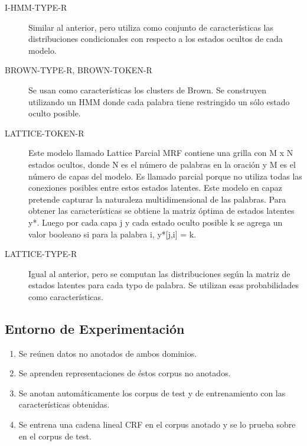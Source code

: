 \documentclass[11pt,spanish]{article}
\begin{document}
\begin{description}
    \item[I-HMM-TYPE-R] Similar al anterior, pero utiliza como conjunto de características las distribuciones condicionales con respecto a los estados ocultos de cada modelo.
    \item[BROWN-TYPE-R, BROWN-TOKEN-R] Se usan como características los clusters de Brown. Se construyen utilizando un HMM donde cada palabra tiene restringido un sólo estado oculto posible.
    \item[LATTICE-TOKEN-R] Este modelo llamado Lattice Parcial MRF contiene una grilla con M x N estados ocultos, donde N es el número de palabras en la oración y M es el número de capas del modelo. Es llamado parcial porque no utiliza todas las conexiones posibles entre estos estados latentes. Este modelo en capaz pretende capturar la naturaleza multidimensional de las palabras. Para obtener las características se obtiene la matriz óptima de estados latentes y*. Luego por cada capa j y cada estado oculto posible k se agrega un valor booleano si para la palabra i, y*[j,i] = k.
    \item[LATTICE-TYPE-R] Igual al anterior, pero se computan las distribuciones según la matriz de estados latentes para cada typo de palabra. Se utilizan esas probabilidades como características.
\end{description}

\subsection{Entorno de Experimentación}
\begin{enumerate}
    \item Se reúnen datos no anotados de ambos dominios.
    \item Se aprenden representaciones de éstos corpus no anotados.
    \item Se anotan automáticamente los corpus de test y de entrenamiento con las características obtenidas.
    \item Se entrena una cadena lineal CRF en el corpus anotado y se lo prueba sobre en el corpus de test.
\end{enumerate}
\end{document}
